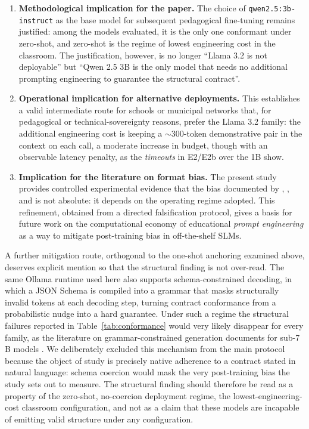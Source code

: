 \documentclass{sbc2023}%
\begin{document}
\begin{enumerate}
\item \textbf{Methodological implication for the paper.} The choice of \texttt{qwen2.5:3b-instruct} as the base model for subsequent pedagogical fine-tuning remains justified: among the models evaluated, it is the only one conformant under zero-shot, and zero-shot is the regime of lowest engineering cost in the classroom. The justification, however, is no longer ``Llama 3.2 is not deployable'' but ``Qwen 2.5 3B is the only model that needs no additional prompting engineering to guarantee the structural contract''.
\item \textbf{Operational implication for alternative deployments.} This establishes a valid intermediate route for schools or municipal networks that, for pedagogical or technical-sovereignty reasons, prefer the Llama 3.2 family: the additional engineering cost is keeping a $\sim$300-token demonstrative pair in the context on each call, a moderate increase in budget, though with an observable latency penalty, as the \textit{timeouts} in E2/E2b over the 1B show.
\item \textbf{Implication for the literature on format bias.} The present study provides controlled experimental evidence that the bias documented by \citet{zheng2023judging}, \citet{wu2023style}, and \citet{liu2025socratic} is not absolute: it depends on the operating regime adopted. This refinement, obtained from a directed falsification protocol, gives a basis for future work on the computational economy of educational \textit{prompt engineering} as a way to mitigate post-training bias in off-the-shelf SLMs.
\end{enumerate}

A further mitigation route, orthogonal to the one-shot anchoring examined above, deserves explicit mention so that the structural finding is not over-read. The same Ollama runtime used here also supports schema-constrained decoding, in which a JSON Schema is compiled into a grammar that masks structurally invalid tokens at each decoding step, turning contract conformance from a probabilistic nudge into a hard guarantee. Under such a regime the structural failures reported in Table~\ref{tab:conformance} would very likely disappear for every family, as the literature on grammar-constrained generation documents for sub-7\,B models \citep{willardlouf2023,dong2024xgrammar}. We deliberately excluded this mechanism from the main protocol because the object of study is precisely native adherence to a contract stated in natural language: schema coercion would mask the very post-training bias the study sets out to measure. The structural finding should therefore be read as a property of the zero-shot, no-coercion deployment regime, the lowest-engineering-cost classroom configuration, and not as a claim that these models are incapable of emitting valid structure under any configuration.
\end{document}
